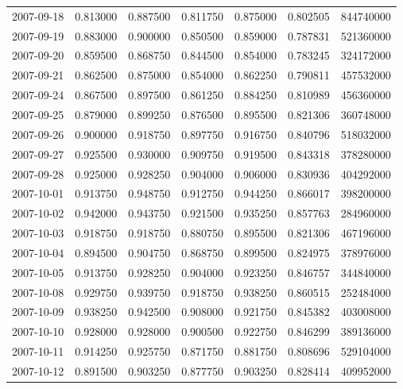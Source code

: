 \begin{tabular}{lrrrrrr}
2007-09-18 &    0.813000 &    0.887500 &    0.811750 &    0.875000 &    0.802505 &   844740000 \\
2007-09-19 &    0.883000 &    0.900000 &    0.850500 &    0.859000 &    0.787831 &   521360000 \\
2007-09-20 &    0.859500 &    0.868750 &    0.844500 &    0.854000 &    0.783245 &   324172000 \\
2007-09-21 &    0.862500 &    0.875000 &    0.854000 &    0.862250 &    0.790811 &   457532000 \\
2007-09-24 &    0.867500 &    0.897500 &    0.861250 &    0.884250 &    0.810989 &   456360000 \\
2007-09-25 &    0.879000 &    0.899250 &    0.876500 &    0.895500 &    0.821306 &   360748000 \\
2007-09-26 &    0.900000 &    0.918750 &    0.897750 &    0.916750 &    0.840796 &   518032000 \\
2007-09-27 &    0.925500 &    0.930000 &    0.909750 &    0.919500 &    0.843318 &   378280000 \\
2007-09-28 &    0.925000 &    0.928250 &    0.904000 &    0.906000 &    0.830936 &   404292000 \\
2007-10-01 &    0.913750 &    0.948750 &    0.912750 &    0.944250 &    0.866017 &   398200000 \\
2007-10-02 &    0.942000 &    0.943750 &    0.921500 &    0.935250 &    0.857763 &   284960000 \\
2007-10-03 &    0.918750 &    0.918750 &    0.880750 &    0.895500 &    0.821306 &   467196000 \\
2007-10-04 &    0.894500 &    0.904750 &    0.868750 &    0.899500 &    0.824975 &   378976000 \\
2007-10-05 &    0.913750 &    0.928250 &    0.904000 &    0.923250 &    0.846757 &   344840000 \\
2007-10-08 &    0.929750 &    0.939750 &    0.918750 &    0.938250 &    0.860515 &   252484000 \\
2007-10-09 &    0.938250 &    0.942500 &    0.908000 &    0.921750 &    0.845382 &   403008000 \\
2007-10-10 &    0.928000 &    0.928000 &    0.900500 &    0.922750 &    0.846299 &   389136000 \\
2007-10-11 &    0.914250 &    0.925750 &    0.871750 &    0.881750 &    0.808696 &   529104000 \\
2007-10-12 &    0.891500 &    0.903250 &    0.877750 &    0.903250 &    0.828414 &   409952000 \\

\end{tabular}
